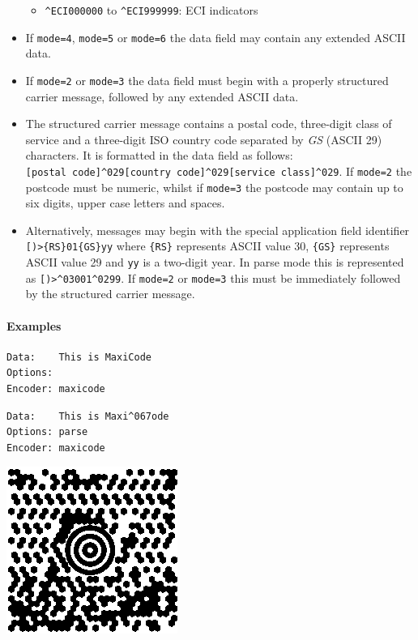 \begin{itemize}
  \begin{itemize}
  \tightlist
  \item
    \texttt{\^{}ECI000000} to \texttt{\^{}ECI999999}: ECI indicators
  \end{itemize}
\item
  If \texttt{mode=4}, \texttt{mode=5} or \texttt{mode=6} the data field
  may contain any extended ASCII data.
\item
  If \texttt{mode=2} or \texttt{mode=3} the data field must begin with a
  properly structured carrier message, followed by any extended ASCII
  data.
\item
  The structured carrier message contains a postal code, three-digit
  class of service and a three-digit ISO country code separated by
  \emph{GS} (ASCII 29) characters. It is formatted in the data field as
  follows:
  \texttt{{[}postal\ code{]}\^{}029{[}country\ code{]}\^{}029{[}service\ class{]}\^{}029}.
  If \texttt{mode=2} the postcode must be numeric, whilst if
  \texttt{mode=3} the postcode may contain up to six digits, upper case
  letters and spaces.
\item
  Alternatively, messages may begin with the special application field
  identifier \texttt{{[})\textgreater{}\{RS\}01\{GS\}yy} where
  \texttt{\{RS\}} represents ASCII value 30, \texttt{\{GS\}} represents
  ASCII value 29 and \texttt{yy} is a two-digit year. In parse mode this
  is represented as \texttt{{[})\textgreater{}\^{}03001\^{}0299}. If
  \texttt{mode=2} or \texttt{mode=3} this must be immediately followed
  by the structured carrier message.
\end{itemize}

\hypertarget{examples-34}{%
\paragraph{Examples}\label{examples-34}}

\begin{verbatim}
Data:    This is MaxiCode
Options: 
Encoder: maxicode
\end{verbatim}

\begin{verbatim}
Data:    This is Maxi^067ode
Options: parse
Encoder: maxicode
\end{verbatim}

\includegraphics{images/maxicode-1.eps}

